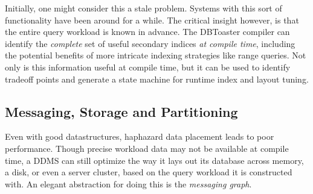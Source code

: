 
Initially, one might consider this a stale problem.  Systems with this sort of functionality\cite{berkeleydb} have been around for a while.  The critical insight however, is that the entire query workload is known in advance.  The DBToaster compiler can identify the \textit{complete} set of useful secondary indices \textit{at compile time}, including the potential benefits of more intricate indexing strategies like range queries\cite{rangequeries}.  Not only is this information useful at compile time, but it can be used to identify tradeoff points and generate a state machine for runtime index and layout tuning.


\subsection{Messaging, Storage and Partitioning}
Even with good datastructures, haphazard data placement leads to poor performance.  Though precise workload data may not be available at compile time, a DDMS can still optimize the way it lays out its database across memory, a disk, or even a server cluster, based on the query workload it is constructed with.  An elegant abstraction for doing this is the \textit{messaging graph}.

